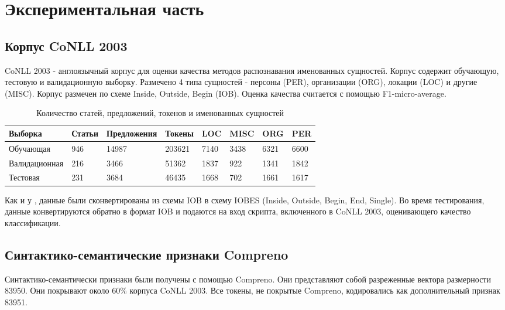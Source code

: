 \chapter{Экспериментальная часть}

\section{Корпус CoNLL 2003}

CoNLL 2003 \citep{tjong2003introduction} - англоязычный корпус для оценки качества
методов распознавания именованных сущностей.
Корпус содержит обучающую, тестовую и валидационную выборку.
Размечено 4 типа сущностей - персоны (PER), организации (ORG), локации (LOC) и другие (MISC).
Корпус размечен по схеме Inside, Outside, Begin (IOB).
Оценка качества считается с помощью F1-micro-average.

\begin{table}[ht]
  \caption{Количество статей, предложений, токенов и именованных сущностей}
  \centering
  \begin{tabular}{ | p{3cm} | p{1.5cm} | p{2.5cm} | p{1.5cm} | p{1cm} | p{1cm} | p{1cm}| p{1cm} |}
    \hline\hline
    Выборка & Статьи & Предложения & Токены & LOC & MISC & ORG & PER \\
    \hline
    Обучающая & 946 & 14987 & 203621 & 7140 & 3438 & 6321 & 6600 \\
    \hline
    Валидационная & 216 & 3466 & 51362 & 1837 & 922 & 1341 & 1842 \\
    \hline
    Тестовая & 231 & 3684 & 46435 & 1668 & 702 & 1661 & 1617 \\
    \hline
  \end{tabular}
\end{table}

Как и у \citep{collobert2011natural}, данные были сконвертированы из схемы IOB
в схему IOBES (Inside, Outside, Begin, End, Single).
Во время тестирования, данные конвертируются обратно в формат IOB и подаются на вход скрипта,
включенного в CoNLL 2003, оценивающего качество классификации.

\section{Синтактико-семантические признаки Compreno}
Синтактико-семантически признаки были получены с помощью Compreno.
Они представляют собой разреженные вектора размерности 83950.
Они покрывают около 60\% корпуса CoNLL 2003.
Все токены, не покрытые Compreno, кодировались как дополнительный признак 83951.

